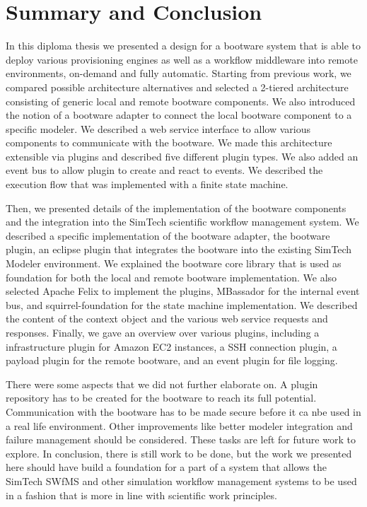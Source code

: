 \chapter{Summary and Conclusion}
\label{conclusion}

In this diploma thesis we presented a design for a bootware system that is able to deploy various provisioning engines as well as a workflow middleware into remote environments, on-demand and fully automatic.
Starting from previous work, we compared possible architecture alternatives and selected a 2-tiered architecture consisting of generic local and remote bootware components.
We also introduced the notion of a bootware adapter to connect the local bootware component to a specific modeler.
We described a web service interface to allow various components to communicate with the bootware.
We made this architecture extensible via plugins and described five different plugin types.
We also added an event bus to allow plugin to create and react to events.
We described the execution flow that was implemented with a finite state machine.

Then, we presented details of the implementation of the bootware components and the integration into the SimTech scientific workflow management system.
We described a specific implementation of the bootware adapter, the bootware plugin, an eclipse plugin that integrates the bootware into the existing SimTech Modeler environment.
We explained the bootware core library that is used as foundation for both the local and remote bootware implementation.
We also selected Apache Felix to implement the plugins, MBassador for the internal event bus, and squirrel-foundation for the state machine implementation.
We described the content of the context object and the various web service requests and responses.
Finally, we gave an overview over various plugins, including a infrastructure plugin for Amazon EC2 instances, a SSH connection plugin, a payload plugin for the remote bootware, and an event plugin for file logging.

There were some aspects that we did not further elaborate on.
A plugin repository has to be created for the bootware to reach its full potential.
Communication with the bootware has to be made secure before it ca nbe used in a real life environment.
Other improvements like better modeler integration and failure management should be considered.
These tasks are left for future work to explore.
In conclusion, there is still work to be done, but the work we presented here should have build a foundation for a part of a system that allows the SimTech SWfMS and other simulation workflow management systems to be used in a fashion that is more in line with scientific work principles.
